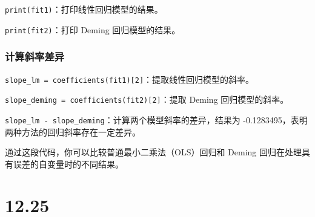 \documentclass[UTF8]{report}
\theoremstyle{MyLineTheoremStyle} %
\theoremstyle{MyBlockTheoremStyle} %
\theoremstyle{MySubsubsectionStyle} %
\begin{document}
\texttt{print(fit1)}：打印线性回归模型的结果。

\texttt{print(fit2)}：打印 Deming 回归模型的结果。

\subsection*{计算斜率差异}

\texttt{slope\_lm = coefficients(fit1)[2]}：提取线性回归模型的斜率。

\texttt{slope\_deming = coefficients(fit2)[2]}：提取 Deming 回归模型的斜率。

\texttt{slope\_lm - slope\_deming}：计算两个模型斜率的差异，结果为 -0.1283495，表明两种方法的回归斜率存在一定差异。

通过这段代码，你可以比较普通最小二乘法（OLS）回归和 Deming 回归在处理具有误差的自变量时的不同结果。



\chapter{12.25}
\end{document}
